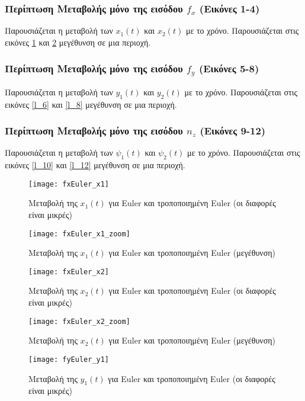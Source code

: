 \documentclass{article}
\begin{document}
\subsubsection{Περίπτωση Μεταβολής μόνο της εισόδου \(f_x\) (Εικόνες 1-4)}
Παρουσιάζεται η μεταβολή των \(x_1(t)\) και \(x_2(t)\) με το χρόνο. Παρουσιάζεται στις εικόνες \ref{l_2} και \ref{l_4} μεγέθυνση σε μια περιοχή. 

\subsubsection{Περίπτωση Μεταβολής μόνο της εισόδου \(f_y\) (Εικόνες 5-8)}
Παρουσιάζεται η μεταβολή των \(y_1(t)\) και \(y_2(t)\) με το χρόνο. Παρουσιάζεται στις εικόνες \ref{l_6} και \ref{l_8} μεγέθυνση σε μια περιοχή.

\subsubsection{Περίπτωση Μεταβολής μόνο της εισόδου \(n_z\) (Εικόνες 9-12)}
Παρουσιάζεται η μεταβολή των \(\psi_1(t)\) και \(\psi_2(t)\) με το χρόνο. Παρουσιάζεται στις εικόνες \ref{l_10} και \ref{l_12} μεγέθυνση σε μια περιοχή.
\clearpage

\begin{figure}[bh!]
 \centering
\texttt{[image: fxEuler\_x1]}
\caption{Μεταβολή της $x_1(t)$ για Euler και τροποποιημένη
 Euler (οι διαφορές είναι μικρές)}
\end{figure}

\begin{figure}[h!]
 \centering
\texttt{[image: fxEuler\_x1\_zoom]}
\caption{Μεταβολή της $x_1(t)$ για Euler και τροποποιημένη Euler (μεγέθυνση)}
\label{l_2}
\end{figure}
\clearpage

\clearpage
\begin{figure}[h!]
 \centering
\texttt{[image: fxEuler\_x2]}
\caption{Μεταβολή της $x_2(t)$ για Euler και τροποποιημένη Euler (οι διαφορές είναι μικρές)}
\end{figure}


\begin{figure}[h!]
 \centering
\texttt{[image: fxEuler\_x2\_zoom]}
\caption{Μεταβολή της $x_2(t)$ για Euler και τροποποιημένη Euler (μεγέθυνση)}
\label{l_4}
\end{figure}
\clearpage

\clearpage
\begin{figure}[h!]
 \centering
\texttt{[image: fyEuler\_y1]}
\caption{Μεταβολή της $y_1(t)$ για Euler και τροποποιημένη
 Euler (οι διαφορές είναι μικρές)}
\end{figure}
\end{document}
